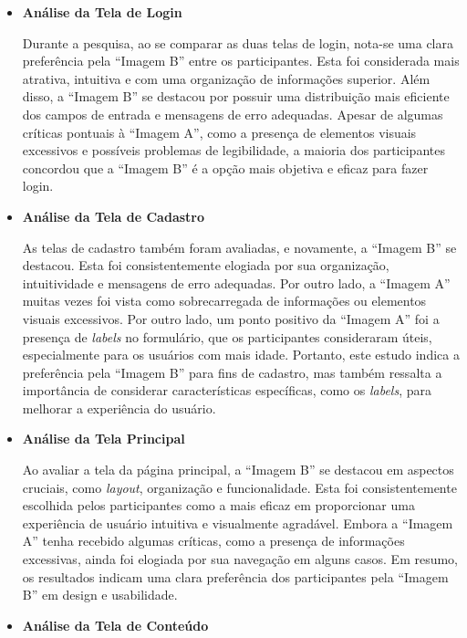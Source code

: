 \begin{itemize}
    \item \textbf{Análise da Tela de Login}
    
    Durante a pesquisa, ao se comparar as duas telas de login, nota-se uma clara preferência pela ``Imagem B'' entre os participantes. Esta foi considerada mais atrativa, intuitiva e com uma organização de informações superior. Além disso, a ``Imagem B'' se destacou por possuir uma distribuição mais eficiente dos campos de entrada e mensagens de erro adequadas. Apesar de algumas críticas pontuais à ``Imagem A'', como a presença de elementos visuais excessivos e possíveis problemas de legibilidade, a maioria dos participantes concordou que a ``Imagem B'' é a opção mais objetiva e eficaz para fazer login.

    \item \textbf{Análise da Tela de Cadastro}
    
    As telas de cadastro também foram avaliadas, e novamente, a ``Imagem B'' se destacou. Esta foi consistentemente elogiada por sua organização, intuitividade e mensagens de erro adequadas. Por outro lado, a ``Imagem A'' muitas vezes foi vista como sobrecarregada de informações ou elementos visuais excessivos. Por outro lado, um ponto positivo da ``Imagem A'' foi a presença de \textit{labels} no formulário, que os participantes consideraram úteis, especialmente para os usuários com mais idade. Portanto, este estudo indica a preferência pela ``Imagem B'' para fins de cadastro, mas também ressalta a importância de considerar características específicas, como os \textit{labels}, para melhorar a experiência do usuário.
    
    \item \textbf{Análise da Tela Principal}
    
    Ao avaliar a tela da página principal, a ``Imagem B'' se destacou em aspectos cruciais, como \textit{layout}, organização e funcionalidade. Esta foi consistentemente escolhida pelos participantes como a mais eficaz em proporcionar uma experiência de usuário intuitiva e visualmente agradável. Embora a ``Imagem A'' tenha recebido algumas críticas, como a presença de informações excessivas, ainda foi elogiada por sua navegação em alguns casos. Em resumo, os resultados indicam uma clara preferência dos participantes pela ``Imagem B'' em design e usabilidade.

    \item \textbf{Análise da Tela de Conteúdo}
    

\end{itemize}
